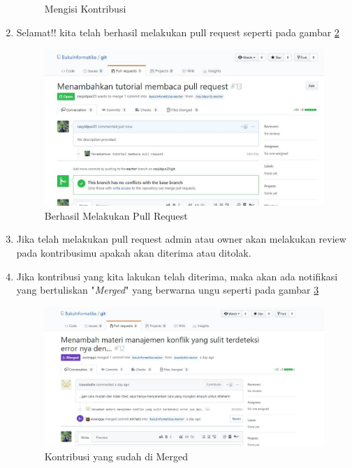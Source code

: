 \begin{enumerate}
\begin{figure}[!htbp]
\caption{Mengisi Kontribusi}
\label{fig:3}
\end{figure}
\item Selamat!! kita telah berhasil melakukan pull request seperti pada gambar \ref{fig:4}
\subitem
\begin{figure}[!htbp]
\centerline{\includegraphics[width=.75\textwidth]{Figures/membacapr/4.JPG}}
\caption{Berhasil Melakukan Pull Request}
\label{fig:4}
\end{figure}
\item Jika telah melakukan pull request admin atau owner akan melakukan review pada kontribusimu apakah akan diterima atau ditolak.
\item Jika kontribusi yang kita lakukan telah diterima, maka akan ada notifikasi yang bertuliskan "\textit{Merged}" yang berwarna ungu seperti pada gambar \ref{fig:merged}
\subitem
\begin{figure}[!htbp]
\centerline{\includegraphics[width=.75\textwidth]{Figures/membacapr/merged.JPG}}
\caption{Kontribusi yang sudah di Merged}
\label{fig:merged}
\end{figure}
\end{enumerate}

